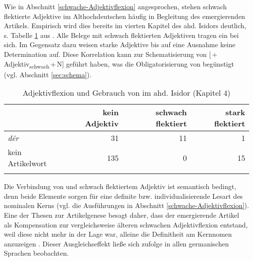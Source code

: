 Wie in Abschnitt \ref{schwache-Adjektivflexion} angesprochen, stehen schwach flektierte Adjektive im Althochdeutschen häufig in Begleitung des emergierenden Artikels. Empirisch wird dies bereits im vierten Kapitel des ahd. Isidors  deutlich, s. Tabelle \ref{tab:adjektive-flick2016} aus \textcite{Flick2018}. Alle Belege mit schwach flektierten Adjektiven tragen ein  bei sich. Im Gegensatz dazu weisen starke Adjektive bis auf eine Ausnahme keine Determination auf. Diese Korrelation kann zur Schematisierung von [\,+\,Adjektiv\textsubscript{schwach}\,+\,N] geführt  haben, was die Obligatorisierung von  begünstigt (vgl. Abschnitt \ref{sec:schema}). 

\begin{table}
\centering
\begin{tabular}{lrrr}
\lsptoprule
                 & {kein Adjektiv} & {schwach flektiert} & {stark flektiert} \\ \midrule
\textit{dër}    & 31                     & 11                         & 1                        \\
kein Artikelwort & 135                    & 0                          & 15                       \\ \lspbottomrule
\end{tabular}
\caption{Adjektivflexion und Gebrauch von  im ahd. Isidor (Kapitel 4) \parencite{Flick2018}}
\label{tab:adjektive-flick2016}
\end{table}

Die Verbindung von  und schwach flektiertem Adjektiv ist semantisch bedingt, denn beide Elemente sorgen für eine definite bzw. individualisierende Lesart des nominalen Kerns  (vgl. die Ausführungen in Abschnitt \ref{schwache-Adjektivflexion}). Eine der Thesen zur Artikelgenese besagt daher, dass der emergierende Artikel als Kompensation zur vergleichsweise älteren schwachen Adjektivflexion entstand, weil diese nicht mehr in der Lage war, alleine die Definitheit am Kernnomen anzuzeigen \parencite{Heinrichs1954,Ebert1978,Kovari1984}. Dieser Ausgleichseffekt ließe sich \textcite[81]{Heinrichs1954} zufolge in allen germanischen Sprachen beobachten. 

